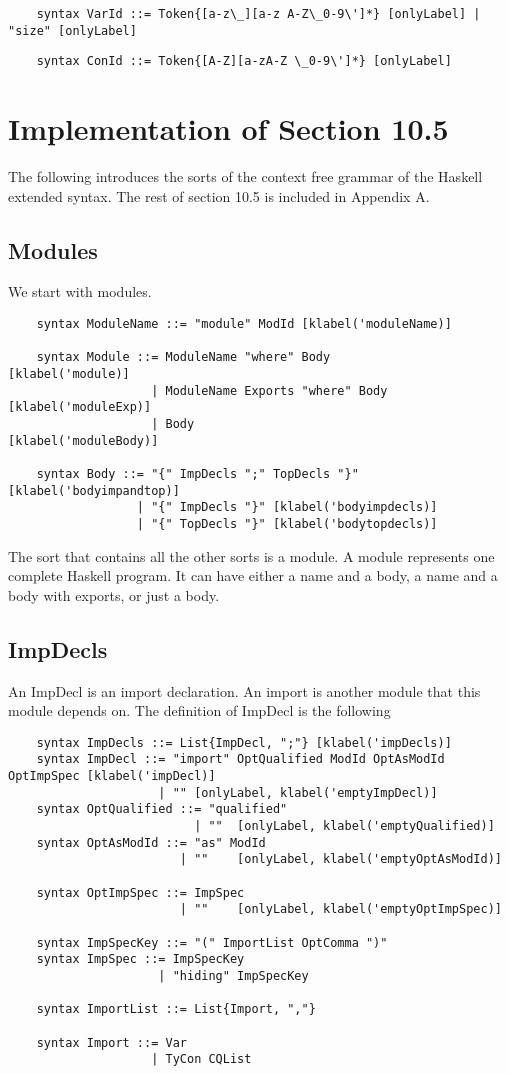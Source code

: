 \begin{lstlisting}
    syntax VarId ::= Token{[a-z\_][a-z A-Z\_0-9\']*} [onlyLabel] | "size" [onlyLabel]
\end{lstlisting}
\begin{lstlisting}
    syntax ConId ::= Token{[A-Z][a-zA-Z \_0-9\']*} [onlyLabel]
\end{lstlisting}

\section{Implementation of Section 10.5}
The following introduces the sorts of the context free grammar of the Haskell extended syntax. The rest of section 10.5 is included in Appendix A.

\subsection{Modules}
We start with modules.
\begin{lstlisting}
    syntax ModuleName ::= "module" ModId [klabel('moduleName)]

    syntax Module ::= ModuleName "where" Body          [klabel('module)]
                    | ModuleName Exports "where" Body  [klabel('moduleExp)]
                    | Body                             [klabel('moduleBody)]

    syntax Body ::= "{" ImpDecls ";" TopDecls "}" [klabel('bodyimpandtop)]
                  | "{" ImpDecls "}" [klabel('bodyimpdecls)]
                  | "{" TopDecls "}" [klabel('bodytopdecls)]
\end{lstlisting}

The sort that contains all the other sorts is a module. A module represents one complete Haskell program. It can have either a name and a body, a name and a body with exports, or just a body.

\subsection{ImpDecls}
An ImpDecl is an import declaration. An import is another module that this module depends on.
The definition of ImpDecl is the following
\begin{lstlisting}
    syntax ImpDecls ::= List{ImpDecl, ";"} [klabel('impDecls)]
    syntax ImpDecl ::= "import" OptQualified ModId OptAsModId OptImpSpec [klabel('impDecl)]
                     | "" [onlyLabel, klabel('emptyImpDecl)]
    syntax OptQualified ::= "qualified"
                          | ""  [onlyLabel, klabel('emptyQualified)]
    syntax OptAsModId ::= "as" ModId
                        | ""    [onlyLabel, klabel('emptyOptAsModId)]

    syntax OptImpSpec ::= ImpSpec
                        | ""    [onlyLabel, klabel('emptyOptImpSpec)]

    syntax ImpSpecKey ::= "(" ImportList OptComma ")"
    syntax ImpSpec ::= ImpSpecKey
                     | "hiding" ImpSpecKey

    syntax ImportList ::= List{Import, ","}

    syntax Import ::= Var
                    | TyCon CQList
\end{lstlisting}

